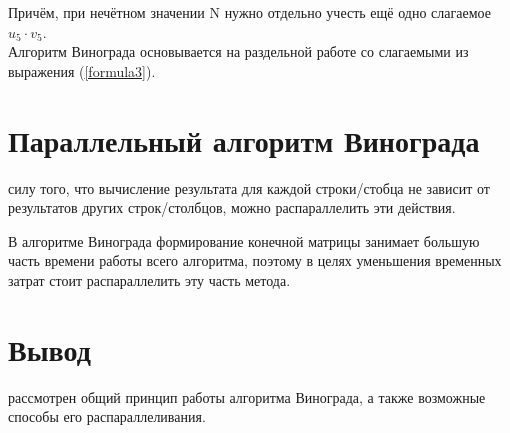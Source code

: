 Причём, при нечётном значении N нужно отдельно учесть ещё одно слагаемое $u_5 \cdot v_5$. \\

Алгоритм Винограда основывается на раздельной работе со слагаемыми из выражения (\ref{formula3}).

\section{Параллельный алгоритм Винограда}
 силу того, что вычисление результата для каждой строки/стобца не зависит от результатов других строк/столбцов, можно распараллелить эти действия.
 
В алгоритме Винограда формирование конечной матрицы занимает большую часть времени работы всего алгоритма, поэтому в целях уменьшения временных затрат стоит распараллелить эту часть метода.

\section*{Вывод}
 рассмотрен общий принцип работы алгоритма Винограда, а также возможные способы его распараллеливания.